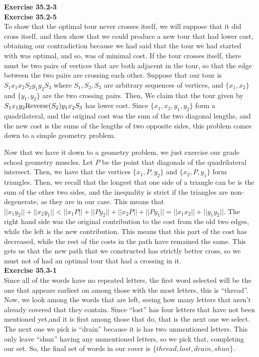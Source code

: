 \documentclass{article}
\begin{document}
\noindent\textbf{Exercise 35.2-3}\\

\noindent\textbf{Exercise 35.2-5}\\

To show that the optimal tour never crosses itself, we will suppose that it did cross itself, and then show that we could produce a new tour that had lower cost, obtaining our contradiction because we had said that the tour we had started with was optimal, and so, was of minimal cost. If the tour crosses itself, there must be two pairs of vertices that are both adjacent in the tour, so that the edge between the two pairs are crossing each other. Suppose that our tour is $S_1x_1 x_2 S_2 y_1 y_2 S_3$ where $S_1,S_2,S_3$ are arbitrary sequences of vertices, and $\{x_1,x_2\}$ and $\{y_1,y_2\}$ are the two crossing pairs. Then, We claim that the tour given by $S_1 x_1 y_2 \hbox{Reverse}(S_2) y_1 x_2 S_3$ has lower cost. Since $\{x_1,x_2,y_1,y_2\}$ form a quadrilateral, and the original cost was the sum of the two diagonal lengths, and the new cost is the sums of the lengths of two opposite sides, this problem comes down to a simple geometry problem.

Now that we have it down to a geometry problem, we just exercise our grade school geometry muscles. Let $P$ be the point that diagonals of the quadrilateral intersect. Then, we have that the vertices $\{x_1,P,y_2\}$ and $\{x_2,P,y_1\}$ form triangles. Then, we recall that the longest that one side of a triangle can be is the sum of the other two sides, and the inequality is strict if the triangles are non-degenerate, as  they are in our case. This means that $||x_1y_2|| + ||x_2y_1|| < ||x_1P|| +||Py_2|| + ||x_2P|| + ||Py_1|| = ||x_1x_2|| + ||y_1y_2||$. The right hand side was the original contribution to the cost from the old two edges, while the left is the new contribution. This means that this part of the cost has decreased, while the rest of the costs in the path have remained the same. This gets us that the new path that we constructed has strictly better cross, so we must not of had an optimal tour that had a crossing in it.\\



\noindent\textbf{Exercise 35.3-1}\\

Since all of the words have no repeated letters, the first word selected will be the one that appears earliest on among those with the most letters, this is ``thread''. Now, we look among the words that are left, seeing how many letters that aren't already covered that they contain. Since ``lost'' has four letters that have not been mentioned yet,and it is first among those that do, that is the next one we select. The next one we pick is ``drain'' because it is has two unmentioned letters. This only leave ``shun'' having any unmentioned letters, so we pick that, completing our set. So, the final set of words in our cover is $\{thread,lost,drain,shun\}$.\\
\end{document}
